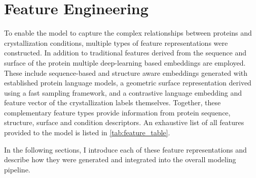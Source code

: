 \section{Feature Engineering}\label{sec:methods/feature_engineering}
To enable the model to capture the complex relationships between proteins and crystallization conditions, multiple types of feature representations were constructed. In addition to traditional features derived from the sequence and surface of the protein multiple deep-learning based embeddings are employed. These include sequence-based and structure aware embeddings generated with established protein language models, a geometric surface representation derived using a fast sampling framework, and a contrastive language embedding and feature vector of the crystallization labels themselves. Together, these complementary feature types provide information from protein sequence, structure, surface and condition descriptors. An exhaustive list of all features provided to the model is listed in \autoref{tab:feature_table}.

In the following sections, I introduce each of these feature representations and describe how they were generated and integrated into the overall modeling pipeline.












